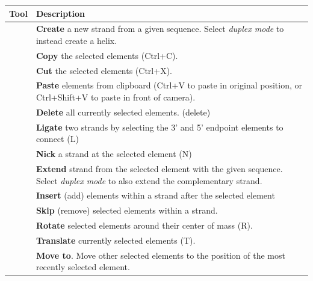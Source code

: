 \begin{table}[h!]
\centering

\begin{tabularx}{\textwidth} { >{\centering\arraybackslash}m{3em} | X }
 \hline
 Tool & Description \\ [0.5ex] 
 \hline
 \hline
 & \textbf{Create} a new strand from a given sequence. Select \textit{duplex mode} to instead create a helix. \\ \hline
 & \textbf{Copy} the selected elements (Ctrl+C). \\ \hline
 & \textbf{Cut} the selected elements (Ctrl+X). \\ \hline
 & \textbf{Paste} elements from clipboard (Ctrl+V to paste in original position, or Ctrl+Shift+V to paste in front of camera). \\ \hline
 & \textbf{Delete} all currently selected elements. (delete) \\ \hline
 & \textbf{Ligate} two strands by selecting the 3' and 5' endpoint elements to connect (L) \\ \hline
 & \textbf{Nick} a strand at the selected element (N) \\ \hline
 & \textbf{Extend} strand from the selected element with the given sequence. Select \textit{duplex mode }to also extend the complementary strand. \\ \hline
 & \textbf{Insert} (add) elements within a strand after the selected element \\ \hline
 & \textbf{Skip} (remove)  selected elements within a strand. \\ \hline
 & \textbf{Rotate} selected elements around their center of mass (R). \\ \hline
 & \textbf{Translate} currently selected elements (T). \\ \hline
 & \textbf{Move to}. Move other selected elements to the position of the most recently selected element. \\ \hline

\end{tabularx}
\end{table}
